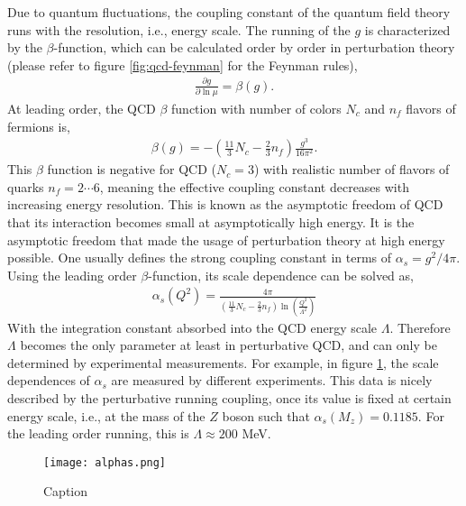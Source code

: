 Due to quantum fluctuations, the coupling constant of the quantum field theory runs with the resolution, i.e., energy scale. 
The running of the $g$ is characterized by the $\beta$-function, which can be calculated order by order in perturbation theory (please refer to figure \ref{fig:qcd-feynman} for the Feynman rules), 
\begin{eqnarray}
\frac{\partial g}{\partial \ln\mu} = \beta(g).
\end{eqnarray}
At leading order, the QCD $\beta$ function with number of colors $N_c$ and $n_f$ flavors of fermions is,
\begin{eqnarray}
\beta(g) = - \left( \frac{11}{3}N_c - \frac{2}{3}n_f \right) \frac{g^3}{16\pi^2}.
\end{eqnarray}
This $\beta$ function is negative for QCD ($N_c=3$) with realistic number of flavors of quarks $n_f = 2\cdots 6$, meaning the effective coupling constant decreases with increasing energy resolution.
This is known as the asymptotic freedom of QCD that its interaction becomes small at asymptotically high energy.
It is the asymptotic freedom that made the usage of perturbation theory at high energy possible.
One usually defines the strong coupling constant in terms of $\alpha_s = g^2/4\pi$.
Using the leading order $\beta$-function, its scale dependence can be solved as,
\begin{eqnarray}
    \alpha_s(Q^2) = \frac{4\pi}{\left(\frac{11}{3}N_c - \frac{2}{3}n_f\right)\ln\left(\frac{Q^2}{\Lambda^2}\right)}
\end{eqnarray}
With the integration constant absorbed into the QCD energy scale $\Lambda$.
Therefore $\Lambda$ becomes the only parameter at least in perturbative QCD, and can only be determined by experimental measurements. 
For example, in figure \ref{fig:alphas}, the scale dependences of $\alpha_s$ are measured by different experiments.
This data is nicely described by the perturbative running coupling, once its value is fixed at certain energy scale, i.e., at the mass of the $Z$ boson such that $\alpha_s(M_z) = 0.1185$.
For the leading order running, this is $\Lambda \approx 200$ MeV.

\begin{figure}
    \centering
    \texttt{[image: alphas.png]}
    \caption{Caption}
    \label{fig:alphas}
\end{figure}

